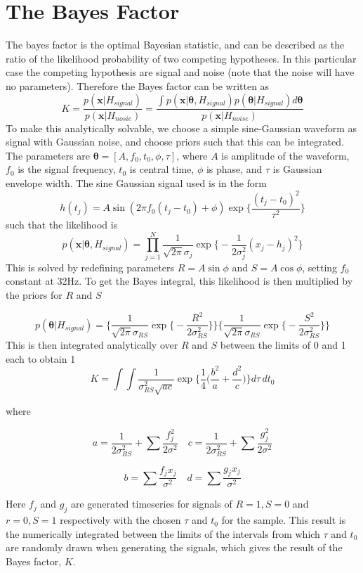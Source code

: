 \documentclass[12pt, letterpaper, twoside]{article}
\begin{document}
\section{The Bayes Factor}
The bayes factor is the optimal Bayesian statistic, and can be described as the ratio of the likelihood probability of two competing hypotheses. In this particular case the competing hypothesis are signal and noise (note that the noise will have no parameters). Therefore the Bayes factor can be written as
\[K = \frac{p(\mathbf{x}|H_{signal})}{p(\mathbf{x}|H_{nosie})}=\frac{\int p(\mathbf{x}|\boldsymbol{\theta}, H_{signal})p(\boldsymbol{\theta}|H_{signal})d\boldsymbol{\theta}}{p(\mathbf{x}|H_{noise})}\]
To make this analytically solvable, we choose a simple sine-Gaussian waveform as signal with Gaussian noise, and choose priors such that this can be integrated. The parameters are $\boldsymbol{\theta}=[A,f_{0}, t_{0}, \phi, \tau]$, where $A$ is amplitude of the waveform, $f_{0}$ is the signal frequency, $t_{0}$ is central time, $\phi$ is phase, and $\tau$ is Gaussian envelope width. The sine Gaussian signal used is in the form
\[h(t_{j})=A\sin (2\pi f_{0}(t_{j}-t_{0})+\phi)\exp\Big \{\frac{(t_{j}-t_{0})^{2}}{\tau^{2}}\Big \}\]
such that the likelihood is
\[p(\mathbf{x}|\boldsymbol{\theta}, H_{signal})= \prod_{j=1}^{N}\frac{1}{\sqrt{2\pi}\sigma_{j}}\exp\Big\{-\frac{1}{2\sigma_{j}^{2}}(x_{j}-h_{j})^{2}\Big\}\]
This is solved by redefining parameters $R=A\sin \phi$ and $S=A \cos \phi$, setting $f_{0}$ constant at 32Hz. To get the Bayes integral, this likelihood is then multiplied by the priors for $R$ and $S$

\[p(\boldsymbol{\theta}|H_{signal})=\bigg\{\frac{1}{\sqrt{2\pi}\sigma_{RS}}\exp\Big\{-\frac{R^{2}}{2\sigma_{RS}^{2}}\Big\}\bigg\} \bigg\{\frac{1}{\sqrt{2\pi}\sigma_{RS}}\exp\Big\{-\frac{S^{2}}{2\sigma_{RS}^{2}}\Big\}\bigg\}\]
 This is then integrated analytically over $R$ and $S$ between the limits of 0 and 1 each to obtain
1
\[K = \int\int\frac{1}{\sigma_{RS}^{2}\sqrt{ac}}\exp\Big\{\frac{1}{4}\Big(\frac{b^{2}}{a}+\frac{d^{2}}{c}\Big)\Big\}d\tau \, dt_{0}\]

where

\[a=\frac{1}{2\sigma_{RS}^{2}}+\sum \frac{f_{j}^{2}}{2\sigma^{2}} \quad c=\frac{1}{2\sigma_{RS}^{2}}+\sum \frac{g_{j}^{2}}{2\sigma^{2}} \]

\[b= \sum \frac{f_{j}x_{j}}{\sigma^{2}} \quad d=\sum \frac{g_{j}x_{j}}{\sigma^{2}} \]

Here $f_{j}$ and $g_{j}$ are generated timeseries for signals of $R=1, S=0$ and $r=0, S=1$ respectively with the chosen $\tau$ and $t_{0}$ for the sample. This result is the numerically integrated between the limits of the intervals from which $\tau$ and $t_{0}$ are randomly drawn when generating the signals, which gives the result of the Bayes factor, $K$.
\end{document}
